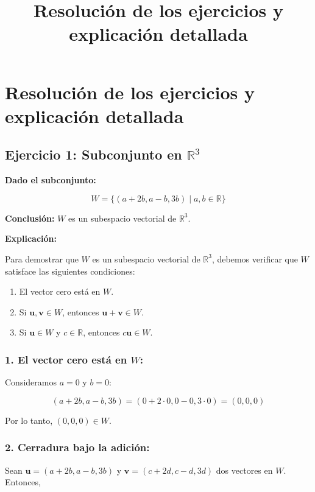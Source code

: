 \documentclass{article}
\title{Resolución de los ejercicios y explicación detallada}
\author{}
\date{}
\begin{document}
\maketitle

\section*{Resolución de los ejercicios y explicación detallada}

\subsection*{Ejercicio 1: Subconjunto en \(\mathbb{R}^3\)}

\textbf{Dado el subconjunto:}

\[ W = \{(a + 2b, a - b, 3b) \mid a, b \in \mathbb{R}\} \]

\textbf{Conclusión:} \( W \) es un subespacio vectorial de \(\mathbb{R}^3\).

\textbf{Explicación:}

Para demostrar que \( W \) es un subespacio vectorial de \(\mathbb{R}^3\), debemos verificar que \( W \) satisface las siguientes condiciones:

\begin{enumerate}
    \item El vector cero está en \( W \).
    \item Si \(\mathbf{u}, \mathbf{v} \in W\), entonces \(\mathbf{u} + \mathbf{v} \in W\).
    \item Si \(\mathbf{u} \in W\) y \(c \in \mathbb{R}\), entonces \(c\mathbf{u} \in W\).
\end{enumerate}

\subsubsection*{1. El vector cero está en \( W \):}

Consideramos \(a = 0\) y \(b = 0\):

\[ (a + 2b, a - b, 3b) = (0 + 2 \cdot 0, 0 - 0, 3 \cdot 0) = (0, 0, 0) \]

Por lo tanto, \((0, 0, 0) \in W\).

\subsubsection*{2. Cerradura bajo la adición:}

Sean \(\mathbf{u} = (a + 2b, a - b, 3b)\) y \(\mathbf{v} = (c + 2d, c - d, 3d)\) dos vectores en \(W\). Entonces,
\end{document}
